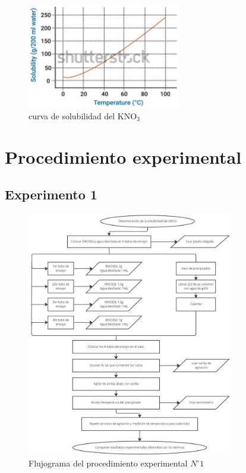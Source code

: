 \documentclass[11pt]{scrartcl}
\begin{document}
\begin{figure}[H]
	\caption{curva de solubilidad del $\mathrm{KNO}_{3}$}
\begin{center}
\includegraphics[width=0.6\textwidth]{2023_06_07_d6ea23c48f19fc3f50b0g-05}
\end{center}
\end{figure}

\section{Procedimiento experimental}
\subsection{Experimento 1}
\begin{figure}[H]
	\caption{Flujograma del procedimiento experimental $N^{\circ} 1$}
	\begin{center}
\includegraphics[width=0.8\textwidth]{2023_06_07_d6ea23c48f19fc3f50b0g-06}
\end{center}
\end{figure}
\end{document}
